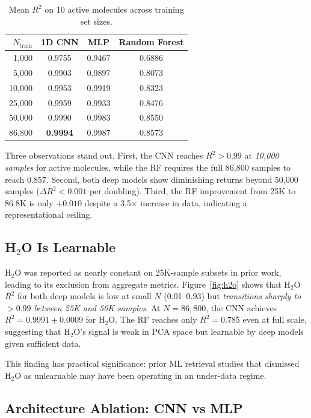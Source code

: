 \documentclass[11pt]{article}
\begin{document}
\begin{table}[t]
  \centering
  \caption{Mean $R^2$ on 10 active molecules across training set sizes.
           \label{tab:scaling}}
  \smallskip
  \begin{tabular}{rccc}
    \toprule
    $N_{\text{train}}$ & 1D CNN & MLP & Random Forest \\
    \midrule
    1{,}000  & 0.9755 & 0.9467 & 0.6886 \\
    5{,}000  & 0.9903 & 0.9897 & 0.8073 \\
    10{,}000 & 0.9953 & 0.9919 & 0.8323 \\
    25{,}000 & 0.9959 & 0.9933 & 0.8476 \\
    50{,}000 & 0.9990 & 0.9983 & 0.8550 \\
    86{,}800 & \textbf{0.9994} & 0.9987 & 0.8573 \\
    \bottomrule
  \end{tabular}
\end{table}

Three observations stand out. First, the CNN reaches $R^2 > 0.99$ at
\textit{10{,}000 samples} for active molecules, while the RF requires
the full 86{,}800 samples to reach 0.857. Second, both deep models show
diminishing returns beyond 50{,}000 samples ($\Delta R^2 < 0.001$ per
doubling). Third, the RF improvement from 25K to 86.8K is only $+0.010$
despite a 3.5$\times$ increase in data, indicating a representational ceiling.

\subsection{H\texorpdfstring{$_2$}{2}O Is Learnable}
\label{sec:h2o}

H$_2$O was reported as nearly constant on 25K-sample subsets in prior work,
leading to its exclusion from aggregate metrics. Figure~\ref{fig:h2o} shows
that H$_2$O $R^2$ for both deep models is low at small $N$ (0.01--0.93) but
\textit{transitions sharply to $>0.99$ between 25K and 50K samples}. At
$N = 86{,}800$, the CNN achieves $R^2 = 0.9991 \pm 0.0009$ for H$_2$O. The
RF reaches only $R^2 = 0.785$ even at full scale, suggesting that H$_2$O's
signal is weak in PCA space but learnable by deep models given sufficient data.

This finding has practical significance: prior ML retrieval studies that
dismissed H$_2$O as unlearnable may have been operating in an under-data regime.

\subsection{Architecture Ablation: CNN vs MLP}
\label{sec:ablation}
\end{document}
